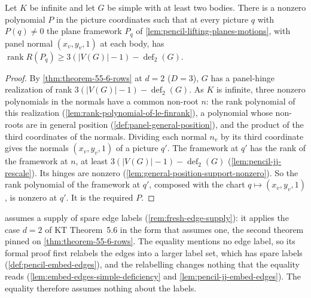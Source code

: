\begin{lemma}
  \label{lem:pencil-jj-chart}
  \leanok
  Let $K$ be infinite and let $G$ be simple with at least two bodies.
  There is a nonzero polynomial $P$ in the picture coordinates such that
  at every picture $q$ with $P(q) \ne 0$ the plane framework $P_q$ of
  \cref{lem:pencil-lifting-planes-motions}, with panel normal
  $(x_v, y_v, 1)$ at each body, has
  $\operatorname{rank} R(P_q) \ge 3(|V(G)| - 1) -
  \operatorname{def}_2(G)$.
\end{lemma}
\begin{proof}
  \leanok
  By \cref{thm:theorem-55-6-rows} at $d = 2$ ($D = 3$), $G$ has a
  panel-hinge realization of rank
  $3(|V(G)| - 1) - \operatorname{def}_2(G)$. As $K$ is infinite, three
  nonzero polynomials in the normals have a common non-root $n$: the rank
  polynomial of this realization
  (\cref{lem:rank-polynomial-of-le-finrank}), a polynomial whose non-roots
  are in general position (\cref{def:panel-general-position}), and the
  product of the third coordinates of the normals. Dividing each normal
  $n_v$ by its third coordinate gives the normals $(x_v, y_v, 1)$ of a
  picture $q'$. The framework at $q'$ has the rank of the framework at
  $n$, at least $3(|V(G)| - 1) - \operatorname{def}_2(G)$
  (\cref{lem:pencil-jj-rescale}). Its hinges are nonzero
  (\cref{lem:general-position-support-nonzero}). So the rank polynomial
  of the framework at $q'$, composed with the chart
  $q \mapsto (x_v, y_v, 1)$, is nonzero at $q'$. It is the required $P$.
\end{proof}

\begin{fmlnote}
  \label{fmlnote:pencil-jj-embed-edges}
   assumes a supply of spare edge labels
  (\cref{rem:fresh-edge-supply}): it applies the case $d = 2$ of KT
  Theorem~5.6 in the form that assumes one, the second theorem pinned on
  \cref{thm:theorem-55-6-rows}. The equality mentions no
  edge label, so its formal proof first relabels the edges into a
  larger label set, which has spare labels (\cref{def:pencil-embed-edges}), and the
  relabelling changes nothing that the equality reads
  (\cref{lem:embed-edges-simple-deficiency} and
  \cref{lem:pencil-jj-embed-edges}). The equality therefore assumes
  nothing about the labels.
\end{fmlnote}

